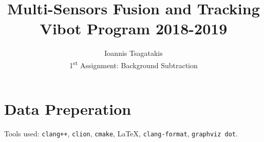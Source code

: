 \documentclass[a4paper,12pt]{article}
\begin{document}
\title{ Multi-Sensors Fusion and Tracking\\Vibot Program 2018-2019}
\author{Ioannis Tsagatakis\\
1\textsuperscript{st} Assignment: Background Subtraction} 
 
\maketitle

\section*{Data Preperation}


\vfill
\noindent Tools used: \texttt{clang++}, \texttt{clion},  \texttt{cmake}, \LaTeX{}, \texttt{clang-format}, \texttt{graphviz dot}.
\end{document}
